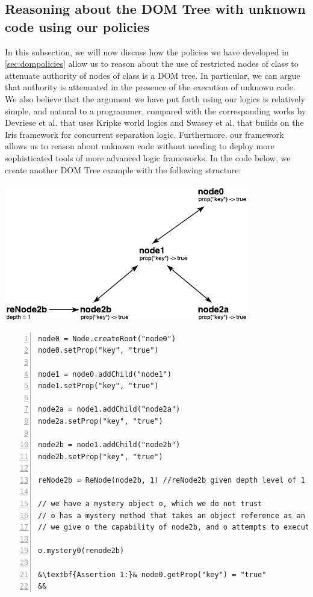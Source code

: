 \documentclass[a4paper,11pt,twoside]{article}
\begin{document}
\subsection{Reasoning about the DOM Tree with unknown code using our policies}\label{sec:treereasoning}
In this subsection, we will now discuss how the policies we have developed in \cref{sec:dompolicies} allow us to reason about  the use of restricted nodes of class  to attenuate authority of nodes of class  is a DOM tree. In particular, we can argue that authority is attenuated in the presence of the execution of unknown code. We also believe that the argument we have put forth using our logics is relatively simple, and natural to a programmer, compared with the corresponding works by Devriese et al.\cite{devriese2016} that uses Kripke world logics and Swasey et al.\cite{swasey2017} that builds on the Iris framework for concurrent separation logic. Furthermore, our framework allows us to reason about unknown code without needing to deploy more sophisticated tools of more advanced logic frameworks. In the code below, we create another DOM Tree example with the following structure:\\
\begin{minipage}{\textwidth}
\centering
\includegraphics[width=0.80\textwidth]{figures/assertion.pdf}
  \label{DOM example}
\end{minipage}
\begin{lstlisting}[numbers = left]
node0 = Node.createRoot("node0")
node0.setProp("key", "true")

node1 = node0.addChild("node1")
node1.setProp("key", "true")

node2a = node1.addChild("node2a")
node2a.setProp("key", "true")

node2b = node1.addChild("node2b")
node2b.setProp("key", "true")

reNode2b = ReNode(node2b, 1) //reNode2b given depth level of 1

// we have a mystery object o, which we do not trust
// o has a mystery method that takes an object reference as an argument
// we give o the capability of node2b, and o attempts to execute a mystery method on renode2b:

o.mystery0(renode2b)

&\textbf{Assertion 1:}& node0.getProp("key") = "true"
&&
\end{lstlisting} 
\end{document}
